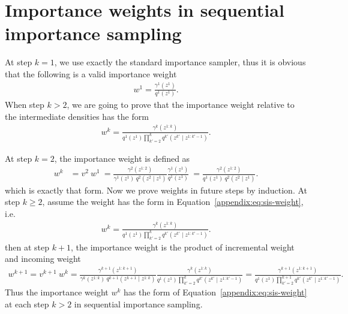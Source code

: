 \documentclass{article}
\theoremstyle{definition}
\begin{document}
\section{Importance weights in sequential importance sampling}
\label{appendix:sis-weight}
At step $k=1$, we use exactly the standard importance sampler, thus it is obvious that the following is a valid importance weight
\begin{align*}
    w^1 = \frac{\gamma^1(z^1)}{q^1(z^1)}.
\end{align*}
When step $k>2$, we are going to prove that the importance weight relative to the intermediate densities has the form
\begin{align}
    \label{appendix:eq:sis-weight}
    w^k
    = 
    \frac{\gamma^k(z^{1:k})}
         {q^1(z^1) \prod_{k'=2}^k q^{k'}(z^{k'} \mid z^{1:k'-1})}.
\end{align}

At step $k=2$, the importance weight is defined as 
\begin{align*}
    w^k 
    &= 
    v^{2} \: w^1
    \: =
    \frac{\gamma^2(z^{1:2})}{\gamma^{1}(z^{1})\:q^2(z^2 \mid z^{1})} \frac{\gamma^1(z^1)}{q^1(z^1)}
    \: = \frac{\gamma^2(z^{1:2})}{q^1(z^1) \: q^2(z^2 \mid z^{1})}.
\end{align*}
which is exactly that form. Now we prove weights in future steps by induction. At step $k\geq 2$, assume the weight has the form in Equation~\ref{appendix:eq:sis-weight}, i.e.
\begin{align*}
    w^k
    = 
    \frac{\gamma^k(z^{1:k})}
         {q^1(z^1) \prod_{k'=2}^k q^{k'}(z^{k'} \mid z^{1:k'-1})}.    
\end{align*}
then at step $k+1$, the importance weight is the product of incremental weight and incoming weight 
\begin{align*}
    w^{k+1}
    =
    v^{k+1} \: w^k
    =
    \frac{\gamma^{k+1}(z^{1:k+1})}{\gamma^{k}(z^{1:k})\:q^{k+1}(z^{k+1} \mid z^{1:k})}
    \frac{\gamma^k(z^{1:k})}
         {q^1(z^1) \prod_{k'=2}^k q^{k'}(z^{k'} \mid z^{1:k'-1})}
    =
    \frac{\gamma^{k+1}(z^{1:k+1})}{q^1(z^1) \prod_{k'=2}^{k+1} q^{k'}(z^{k'} \mid z^{1:k'-1})}
    .    
\end{align*}
Thus the importance weight $w^k$ has the form of Equation~\ref{appendix:eq:sis-weight} at each step $k>2$ in sequential importance sampling.
\end{document}
